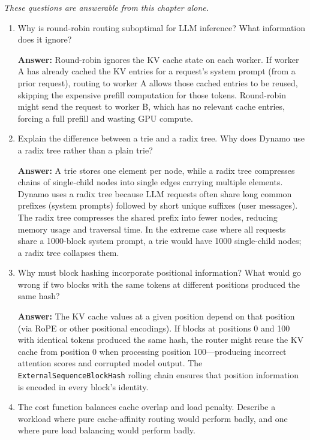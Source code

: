 \smallskip
\noindent\emph{These questions are answerable from this chapter alone.}

\begin{enumerate}
  \item Why is round-robin routing suboptimal for LLM inference? What information does it ignore?

  \textbf{Answer:} Round-robin ignores the KV cache state on each worker. If worker A has already cached the KV entries for a request's system prompt (from a prior request), routing to worker A allows those cached entries to be reused, skipping the expensive prefill computation for those tokens. Round-robin might send the request to worker B, which has no relevant cache entries, forcing a full prefill and wasting GPU compute.

  \item Explain the difference between a trie and a radix tree. Why does Dynamo use a radix tree rather than a plain trie?

  \textbf{Answer:} A trie stores one element per node, while a radix tree compresses chains of single-child nodes into single edges carrying multiple elements. Dynamo uses a radix tree because LLM requests often share long common prefixes (system prompts) followed by short unique suffixes (user messages). The radix tree compresses the shared prefix into fewer nodes, reducing memory usage and traversal time. In the extreme case where all requests share a 1000-block system prompt, a trie would have 1000 single-child nodes; a radix tree collapses them.

  \item Why must block hashing incorporate positional information? What would go wrong if two blocks with the same tokens at different positions produced the same hash?

  \textbf{Answer:} The KV cache values at a given position depend on that position (via RoPE or other positional encodings). If blocks at positions 0 and 100 with identical tokens produced the same hash, the router might reuse the KV cache from position 0 when processing position 100---producing incorrect attention scores and corrupted model output. The \texttt{ExternalSequenceBlockHash} rolling chain ensures that position information is encoded in every block's identity.

  \item The cost function balances cache overlap and load penalty. Describe a workload where pure cache-affinity routing would perform badly, and one where pure load balancing would perform badly.


\end{enumerate}
